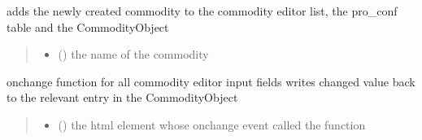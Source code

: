 \documentclass[letterpaper,10pt,english]{sphinxmanual}
\begin{document}

\begin{fulllineitems}
\label{\detokenize{docs_gui/js_api/urbs_editor/commodity_editor:createNewCommodity}}
\pysigstartsignatures
{}
\pysigstopsignatures
\sphinxAtStartPar
adds the newly created commodity to the commodity editor list, the pro\_conf table and the CommodityObject
\begin{quote}\begin{description}
\begin{itemize}
\item {} 
\sphinxAtStartPar
{} () \textendash{} the name of the commodity

\end{itemize}

\end{description}\end{quote}

\end{fulllineitems}


\begin{fulllineitems}
\label{\detokenize{docs_gui/js_api/urbs_editor/commodity_editor:writeBackCommodityFeatures}}
\pysigstartsignatures
{}
\pysigstopsignatures
\sphinxAtStartPar
onchange function for all commodity editor input fields
writes changed value back to the relevant entry in the CommodityObject
\begin{quote}\begin{description}
\begin{itemize}
\item {} 
\sphinxAtStartPar
{} () \textendash{} the html element whose onchange event called the function

\end{itemize}

\end{description}\end{quote}

\end{fulllineitems}
\end{document}
